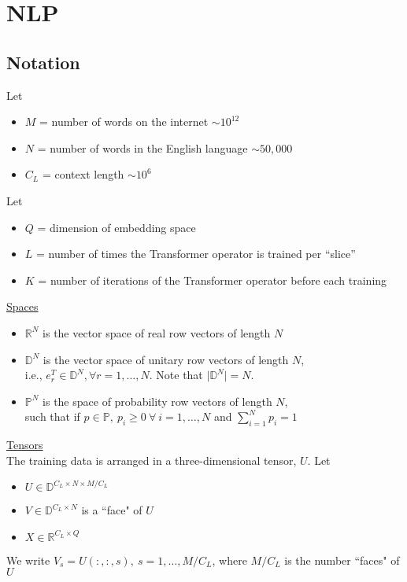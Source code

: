 \documentclass{article}
\begin{document}
\newpage

\section{NLP}

\subsection{Notation}

Let
\begin{itemize}
    \item $M$ = number of words on the internet $\sim 10^{12}$
    \item $N$ = number of words in the English language $\sim 50,000$
    \item $C_L$ = context length $\sim 10^{6}$
\end{itemize}

Let
\begin{itemize}
    \item $Q$ = dimension of embedding space
    \item $L$ = number of times the Transformer operator is trained per ``slice''
    \item $K$ = number of iterations of the Transformer operator before each training
\end{itemize}

\medskip
\noindent \underline{Spaces}
\begin{itemize}
    \item $\mathbb{R}^{N}$ is the vector space of real row vectors of length $N$
    \item $\mathbb{D}^N$ is the vector space of unitary row vectors of length $N$, \\ i.e., $e_r^T \in \mathbb{D}^N, \forall r=1,\dots,N$. Note that $\vert \mathbb{D}^N \vert = N$.
  \item $\mathbb{P}^N$ is the space of probability row vectors of length $N$, \\ such that if $p \in \mathbb{P}, \ p_i \ge 0 \ \forall \ i=1, \dots, N$ and $\sum_{i=1}^N p_i=1$
\end{itemize}

\medskip
\noindent \underline{Tensors} \\
The training data is arranged in a three-dimensional tensor, $U$. Let
\begin{itemize}
    \item $U \in \mathbb{D}^{C_L \times N \times M/C_L}$
    \item $V \in \mathbb{D}^{C_L \times N}$ is a ``face" of $U$
    \item $X \in \mathbb{R}^{C_L \times Q}$ 
\end{itemize}
We write $V_s = U(:,:,s), \ s=1,\dots, M/C_L$, where ${M/C_L}$ is the number ``faces" of $U$
\end{document}
